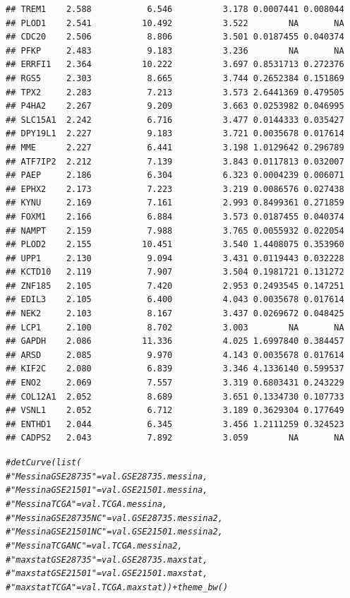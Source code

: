 \documentclass{article}\usepackage[]{graphicx}\usepackage[]{color}
\makeatletter
\newcommand{\hlcom}[1]{\textcolor[rgb]{0.678,0.584,0.686}{\textit{#1}}}%
\newenvironment{kframe}{%
 \def\at@end@of@kframe{}%
 \ifinner\ifhmode%
  \def\at@end@of@kframe{\end{minipage}}%
  \begin{minipage}{\columnwidth}%
 \fi\fi%
 \def\FrameCommand##1{\hskip\@totalleftmargin \hskip-\fboxsep
 \colorbox{shadecolor}{##1}\hskip-\fboxsep
     \hskip-\linewidth \hskip-\@totalleftmargin \hskip\columnwidth}%
 \MakeFramed {\advance\hsize-\width
   \@totalleftmargin\z@ \linewidth\hsize
   \@setminipage}}%
 {\par\unskip\endMakeFramed%
 \at@end@of@kframe}
\newenvironment{knitrout}{}{} %
\makeatother
\begin{document}
\begin{knitrout}
\begin{kframe}
\begin{verbatim}
## TREM1    2.588           6.546          3.178 0.0007441 0.008044
## PLOD1    2.541          10.492          3.522        NA       NA
## CDC20    2.506           8.806          3.501 0.0187455 0.040374
## PFKP     2.483           9.183          3.236        NA       NA
## ERRFI1   2.364          10.222          3.697 0.8531713 0.272376
## RGS5     2.303           8.665          3.744 0.2652384 0.151869
## TPX2     2.283           7.213          3.573 2.6441369 0.479505
## P4HA2    2.267           9.209          3.663 0.0253982 0.046995
## SLC15A1  2.242           6.716          3.477 0.0144333 0.035427
## DPY19L1  2.227           9.183          3.721 0.0035678 0.017614
## MME      2.227           6.441          3.198 1.0129642 0.296789
## ATF7IP2  2.212           7.139          3.843 0.0117813 0.032007
## PAEP     2.186           6.304          6.323 0.0004239 0.006071
## EPHX2    2.173           7.223          3.219 0.0086576 0.027438
## KYNU     2.169           7.161          2.993 0.8499361 0.271859
## FOXM1    2.166           6.884          3.573 0.0187455 0.040374
## NAMPT    2.159           7.988          3.765 0.0055932 0.022054
## PLOD2    2.155          10.451          3.540 1.4408075 0.353960
## UPP1     2.130           9.094          3.431 0.0119443 0.032228
## KCTD10   2.119           7.907          3.504 0.1981721 0.131272
## ZNF185   2.105           7.420          2.953 0.2493545 0.147251
## EDIL3    2.105           6.400          4.043 0.0035678 0.017614
## NEK2     2.103           8.167          3.437 0.0269672 0.048425
## LCP1     2.100           8.702          3.003        NA       NA
## GAPDH    2.086          11.336          4.025 1.6997840 0.384457
## ARSD     2.085           9.970          4.143 0.0035678 0.017614
## KIF2C    2.080           6.839          3.346 4.1336140 0.599537
## ENO2     2.069           7.557          3.319 0.6803431 0.243229
## COL12A1  2.052           8.689          3.651 0.1334730 0.107733
## VSNL1    2.052           6.712          3.189 0.3629304 0.177649
## ENTHD1   2.044           6.345          3.456 1.2111259 0.324523
## CADPS2   2.043           7.892          3.059        NA       NA
\end{verbatim}
\begin{alltt}
\hlcom{# detCurve(list(}
\hlcom{# 	"Messina GSE28735" = val.GSE28735.messina, }
\hlcom{# 	"Messina GSE21501" = val.GSE21501.messina, }
\hlcom{# 	"Messina TCGA" = val.TCGA.messina, }
\hlcom{# 	"Messina GSE28735 NC" = val.GSE28735.messina2, }
\hlcom{# 	"Messina GSE21501 NC" = val.GSE21501.messina2, }
\hlcom{# 	"Messina TCGA NC" = val.TCGA.messina2, }
\hlcom{# 	"maxstat GSE28735" = val.GSE28735.maxstat, }
\hlcom{# 	"maxstat GSE21501" = val.GSE21501.maxstat, }
\hlcom{# 	"maxstat TCGA" = val.TCGA.maxstat)) + theme_bw()}
\end{alltt}
\end{kframe}
\end{knitrout}
\end{document}
